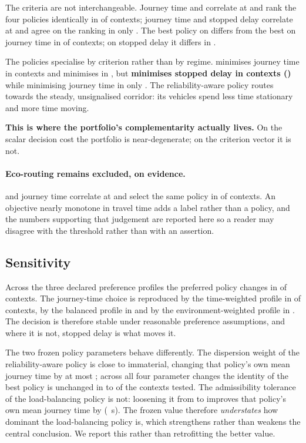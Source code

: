 The criteria are not interchangeable. Journey time and \CO{} correlate at
\NumCorrCOneCTwo{} and rank the four policies identically in
\NumSameOrderCOneCTwo{} of contexts; journey time and stopped delay correlate at
\NumCorrCOneCThree{} and agree on the ranking in only \NumSameOrderCOneCThree{}.
The best policy on \CO{} differs from the best on journey time in
\NumBestCTwoDiffersPct{} of contexts; on stopped delay it differs in
\NumBestCThreeDiffersPct{}.

The policies specialise by criterion rather than by regime. \NumSpecCOnePolicy{}
minimises journey time in \NumSpecCOneN{} contexts and \NumSpecCTwoPolicy{}
minimises \CO{} in \NumSpecCTwoN{}, but \textbf{\NumSpecCThreePolicy{}
minimises stopped delay in \NumSpecCThreeN{} contexts (\NumSpecCThreePct{})}
while minimising journey time in only \NumSpecCOnePFour{}. The
reliability-aware policy routes towards the steady, unsignalised corridor: its
vehicles spend less time stationary and more time moving.

\textbf{This is where the portfolio's complementarity actually lives.} On the
scalar decision cost the portfolio is near-degenerate; on the criterion vector
it is not.

\paragraph{Eco-routing remains excluded, on evidence.} \CO{} and journey time
correlate at \NumCorrCOneCTwo{} and select the same policy in
\NumSameOrderCOneCTwo{} of contexts. An objective nearly monotone in travel time
adds a label rather than a policy, and the numbers supporting that judgement are
reported here so a reader may disagree with the threshold rather than with an
assertion.

\subsection{Sensitivity}

Across the three declared preference profiles the preferred policy changes in
\NumPrefChanges{} of contexts. The journey-time choice is reproduced by the
time-weighted profile in \NumPrefAgreeTime{} of contexts, by the balanced
profile in \NumPrefAgreeBalanced{} and by the environment-weighted profile in
\NumPrefAgreeEnvironment{}. The decision is therefore stable under reasonable
preference assumptions, and where it is not, stopped delay is what moves it.

The two frozen policy parameters behave differently. The dispersion weight of
the reliability-aware policy is close to immaterial, changing that policy's own
mean journey time by at most \NumLambdaMaxChangePct{}; across all four
parameter changes the identity of the best policy is unchanged in
\NumWinnerStableMin{} to \NumWinnerStableMax{} of the contexts tested. The admissibility tolerance
of the load-balancing policy is not: loosening it from \NumEpsFrozen{} to
\NumEpsAlt{} improves that policy's own mean journey time by
\NumEpsGainPct{} (\NumEpsGainSec~s). The frozen value therefore
\emph{understates} how dominant the load-balancing policy is, which strengthens
rather than weakens the central conclusion. We report this rather than
retrofitting the better value.
